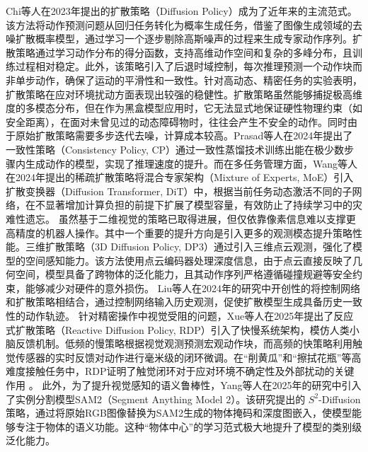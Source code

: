 Chi等人在2023年提出的扩散策略（Diffusion Policy）\cite{chi2025diffusion}成为了近年来的主流范式。该方法将动作预测问题从回归任务转化为概率生成任务，借鉴了图像生成领域的去噪扩散概率模型\cite{ho2020denoising,song2020denoising,song2020score,karras2022elucidating}，通过学习一个逐步剔除高斯噪声的过程来生成专家动作序列。扩散策略通过学习动作分布的得分函数，支持高维动作空间和复杂的多峰分布，且训练过程相对稳定。此外，该策略引入了后退时域控制，每次推理预测一个动作块而非单步动作，确保了运动的平滑性和一致性。针对高动态、精密任务的实验表明，扩散策略在应对环境扰动方面表现出较强的稳健性。扩散策略虽然能够捕捉极高维度的多模态分布，但在作为黑盒模型应用时，它无法显式地保证硬性物理约束（如安全距离），在面对未曾见过的动态障碍物时，往往会产生不安全的动作。同时由于原始扩散策略需要多步迭代去噪，计算成本较高。Prasad等人在2024年提出了一致性策略（Consistency Policy, CP）\cite{prasad2024consistency}通过一致性蒸馏技术\cite{song2023consistency}训练出能在极少数步骤内生成动作的模型，实现了推理速度的提升。而在多任务管理方面，Wang等人在2024年提出的稀疏扩散策略\cite{wang2024sparse}将混合专家架构（Mixture of Experts, MoE）\cite{lepikhin2020gshard}引入扩散变换器（Diffusion Transformer, DiT）\cite{peebles2023scalable}中，根据当前任务动态激活不同的子网络，在不显著增加计算负担的前提下扩展了模型容量，有效防止了持续学习中的灾难性遗忘。
虽然基于二维视觉的策略已取得进展，但仅依靠像素信息难以支撑更高精度的机器人操作。其中一个重要的提升方向是引入更多的观测模态提升策略性能。三维扩散策略（3D Diffusion Policy, DP3）\cite{ze20243d}通过引入三维点云观测，强化了模型的空间感知能力。该方法使用点云编码器处理深度信息，由于点云直接反映了几何空间，模型具备了跨物体的泛化能力，且其动作序列严格遵循碰撞规避等安全约束，能够减少对硬件的意外损伤。
Liu等人在2024年的研究中\cite{liu2024diff}开创性的将控制网络\cite{zhang2023adding}和扩散策略相结合，通过控制网络输入历史观测，促使扩散模型生成具备历史一致性的动作轨迹。
针对精密操作中视觉受阻的问题，Xue等人在2025年提出了反应式扩散策略（Reactive Diffusion Policy, RDP）\cite{xue2025reactive}引入了快慢系统架构，模仿人类小脑反馈机制。低频的慢策略根据视觉观测预测宏观动作块，而高频的快策略利用触觉传感器的实时反馈对动作进行毫米级的闭环微调。在“削黄瓜”和“擦拭花瓶”等高难度接触任务中，RDP证明了触觉闭环对于应对环境不确定性及外部扰动的关键作用 。
此外，为了提升视觉感知的语义鲁棒性，Yang等人在2025年的研究中引入了实例分割模型SAM2（Segment Anything Model 2）\cite{ravi2024sam}。该研究提出的 $S^2$-Diffusion策略\cite{yang2025s}，通过将原始RGB图像替换为SAM2生成的物体掩码和深度图嵌入，使模型能够专注于物体的语义功能。这种“物体中心”的学习范式极大地提升了模型的类别级泛化能力。


